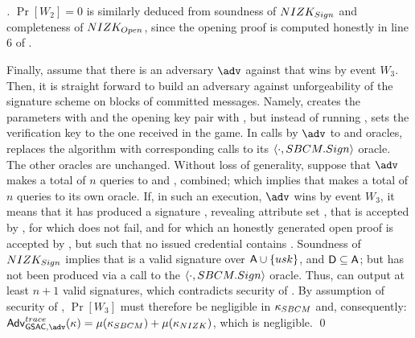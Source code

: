 \begin{proof}[]
  $\Pr[W_2] = 0$ is similarly deduced from soundness of $NIZK_{Sign}$ and
  completeness of $NIZK_{Open}$, since the opening proof is computed
  honestly in line 6 of \ExpGSACTrace.

  Finally, assume that there is an adversary $\adv$ against \ExpGSACTrace that
  wins by event $W_3$. Then, it is straight forward to build an adversary \advB
  against unforgeability of the signature scheme on blocks of committed
  messages. Namely, \advB creates the parameters with \Setup and the opening
  key pair with \OKeyGen, but instead of running \IKeyGen, sets the verification
  key to the one received in the \ExpSBCMOMF game. In calls by $\adv$ to \OBTISS
  and \ISSUE oracles, \advB replaces the \Issue algorithm with corresponding
  calls to its $\langle \cdot,SBCM.Sign \rangle$ oracle. The other oracles are
  unchanged. Without loss of generality, suppose that $\adv$ makes a total of
  $n$ queries to \OBTISS and \ISSUE, combined; which implies that \advB makes
  a total of $n$ queries to its own oracle. If, in such an execution, $\adv$
  wins by event $W_3$, it means that it has produced a signature \sig, revealing
  attribute set \DAttrs, that is accepted by \Verify, for which \Open does not
  fail, and for which an honestly generated open proof is accepted by \Judge,
  but such that no issued credential contains \DAttrs. Soundness of
  $NIZK_{Sign}$ implies that \sig is a valid signature over $\mathsf{A} \cup
  \lbrace usk \rbrace$, and $\mathsf{D} \subseteq \mathsf{A}$; but \sig has not been
  produced via a call to the $\langle \cdot,SBCM.Sign \rangle$ oracle. Thus,
  \advB can output at least $n+1$ valid signatures, which contradicts security
  of \SBCM.
  By assumption of security of \SBCM, $\Pr[W_3]$ must therefore be negligible in
  $\kappa_{SBCM}$ and, consequently: $\AdvGSACTrace(\secpar) = \negl(\SBCMsecpar)+
  \negl(\NIZKsecpar)$, which is negligible.  
  \qed
\end{proof}

